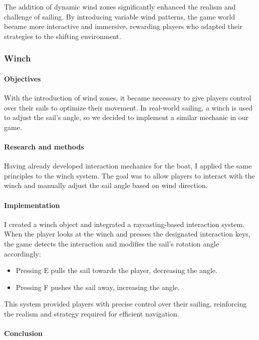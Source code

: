 \documentclass{article}
\begin{document}
The addition of dynamic wind zones significantly enhanced the realism and challenge of sailing. By introducing variable wind patterns, the game world became more interactive and immersive, rewarding players who adapted their strategies to the shifting environment.





\subsubsection{Winch}
\paragraph{Objectives}\hfill

With the introduction of wind zones, it became necessary to give players control over their sails to optimize their movement. In real-world sailing, a winch is used to adjust the sail's angle, so we decided to implement a similar mechanic in our game.

\paragraph{Research and methods}\hfill

Having already developed interaction mechanics for the boat, I applied the same principles to the winch system. The goal was to allow players to interact with the winch and manually adjust the sail angle based on wind direction.

\paragraph{Implementation}\hfill

I created a winch object and integrated a raycasting-based interaction system. When the player looks at the winch and presses the designated interaction keys, the game detects the interaction and modifies the sail's rotation angle accordingly:
\begin{itemize}
    \item Pressing E pulls the sail towards the player, decreasing the angle.
    \item Pressing F pushes the sail away, increasing the angle.
\end{itemize}
This system provided players with precise control over their sailing, reinforcing the realism and strategy required for efficient navigation.

\paragraph{Conclusion}\hfill
\end{document}
